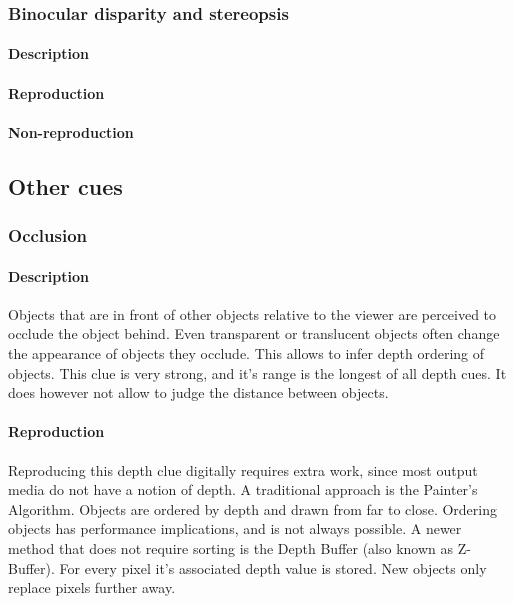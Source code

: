 \subsubsection{Binocular disparity and stereopsis}
\paragraph{Description}

\paragraph{Reproduction}

\paragraph{Non-reproduction}



\subsection{Other cues}


\subsubsection{Occlusion}
\paragraph{Description}
Objects that are in front of other objects relative to the viewer are perceived to occlude the object behind. Even transparent or translucent objects often change the appearance of objects they occlude. This allows to infer depth ordering of objects. This clue is very strong, and it's range is the longest of all depth cues. It does however not allow to judge the distance between objects.

\paragraph{Reproduction}
Reproducing this depth clue digitally requires extra work, since most output media do not have a notion of depth. A traditional approach is the Painter's Algorithm\cite{painters}. Objects are ordered by depth and drawn from far to close. Ordering objects has performance implications, and is not always possible.
A newer method that does not require sorting is the Depth Buffer\cite{zbuffer} (also known as Z-Buffer). For every pixel it's associated depth value is stored. New objects only replace pixels further away.

